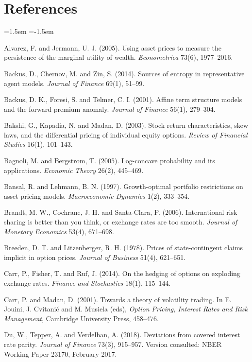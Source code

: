\documentclass[11pt]{article}
\theoremstyle{remark}
\begin{document}
\section*{References}
\begin{list}{}{\leftmargin=1.5em \itemindent=-1.5em \itemsep=2pt \parsep=0pt}\small
\item Alvarez, F. and Jermann, U. J. (2005). Using asset prices to measure the persistence of the marginal utility of wealth. \emph{Econometrica} 73(6), 1977--2016.
\item Backus, D., Chernov, M. and Zin, S. (2014). Sources of entropy in representative agent models. \emph{Journal of Finance} 69(1), 51--99.
\item Backus, D. K., Foresi, S. and Telmer, C. I. (2001). Affine term structure models and the forward premium anomaly. \emph{Journal of Finance} 56(1), 279--304.
\item Bakshi, G., Kapadia, N. and Madan, D. (2003). Stock return characteristics, skew laws, and the differential pricing of individual equity options. \emph{Review of Financial Studies} 16(1), 101--143.
\item Bagnoli, M. and Bergstrom, T. (2005). Log-concave probability and its applications. \emph{Economic Theory} 26(2), 445--469.
\item Bansal, R. and Lehmann, B. N. (1997). Growth-optimal portfolio restrictions on asset pricing models. \emph{Macroeconomic Dynamics} 1(2), 333--354.
\item Brandt, M. W., Cochrane, J. H. and Santa-Clara, P. (2006). International risk sharing is better than you think, or exchange rates are too smooth. \emph{Journal of Monetary Economics} 53(4), 671--698.
\item Breeden, D. T. and Litzenberger, R. H. (1978). Prices of state-contingent claims implicit in option prices. \emph{Journal of Business} 51(4), 621--651.
\item Carr, P., Fisher, T. and Ruf, J. (2014). On the hedging of options on exploding exchange rates. \emph{Finance and Stochastics} 18(1), 115--144.
\item Carr, P. and Madan, D. (2001). Towards a theory of volatility trading. In E. Jouini, J. Cvitani\'c and M. Musiela (eds), \emph{Option Pricing, Interest Rates and Risk Management}, Cambridge University Press, 458--476.
\item Du, W., Tepper, A. and Verdelhan, A. (2018). Deviations from covered interest rate parity. \emph{Journal of Finance} 73(3), 915--957. Version consulted: NBER Working Paper 23170, February 2017.

\end{list}
\end{document}

